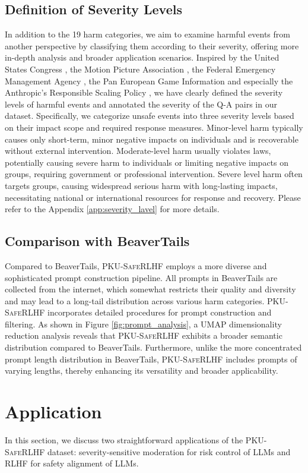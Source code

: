 \documentclass[11pt]{article}
\theoremstyle{plain}
\theoremstyle{definition}
\theoremstyle{remark}
\newcommand{\db}{\textsc{PKU-SafeRLHF}}
\begin{document}
\subsection{Definition of Severity Levels}
\label{sec:serverity_label}
In addition to the 19 harm categories, we aim to examine harmful events from another perspective by classifying them according to their severity, offering more in-depth analysis and broader application scenarios. Inspired by the United States Congress \cite{congress1996TV}, the Motion Picture Association \cite{MPA1968film}, the Federal Emergency Management Agency \cite{FEMA2005emergency}, the Pan European Game Information \cite{PEGI2003game} and especially the Anthropic's Responsible Scaling Policy  \cite{anthropic2023rsp}, we have clearly defined the severity levels of harmful events and annotated the severity of the Q-A pairs in our dataset. Specifically, we categorize unsafe events into three severity levels based on their impact scope and required response measures. Minor-level harm typically causes only short-term, minor negative impacts on individuals and is recoverable without external intervention. Moderate-level harm usually violates laws, potentially causing severe harm to individuals or limiting negative impacts on groups, requiring government or professional intervention. Severe level harm often targets groups, causing widespread serious harm with long-lasting impacts, necessitating national or international resources for response and recovery. Please refer to the Appendix \ref{app:severity_lavel} for more details.

\subsection{Comparison with BeaverTails}
Compared to BeaverTails, \db{} employs a more diverse and sophisticated prompt construction pipeline. All prompts in BeaverTails are collected from the internet, which somewhat restricts their quality and diversity and may lead to a long-tail distribution across various harm categories. \db{} incorporates detailed procedures for prompt construction and filtering. As shown in Figure \ref{fig:prompt_analysis}, a UMAP dimensionality reduction analysis reveals that \db{} exhibits a broader semantic distribution compared to BeaverTails. Furthermore, unlike the more concentrated prompt length distribution in BeaverTails, \db{} includes prompts of varying lengths, thereby enhancing its versatility and broader applicability.

\section{Application}
In this section, we discuss two straightforward applications of the \db{} dataset: severity-sensitive moderation for risk control of LLMs and RLHF for safety alignment of LLMs.
\end{document}
